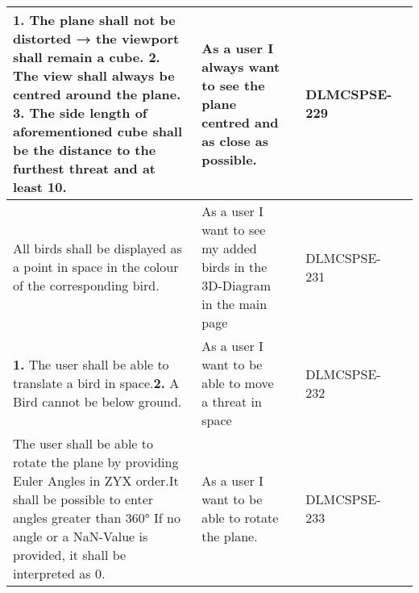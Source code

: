 \begin{xltabular}{\textwidth}{|X|X|M{1.8cm}|M{1.4cm}|M{1.3cm}|}
  \textbf{1.} The plane shall not be distorted → the viewport shall remain a cube. \newline\newline \textbf{2.} The view shall always be centred around the plane. \newline\newline \textbf{3.} The side length of aforementioned cube shall be the distance to the furthest threat and at least 10. & As a user I always want to see the plane centred and as close as possible. &  & {\color{purpleT}\ttfamily DLMCSPSE-229} &  \\ \hline 
  All birds shall be displayed as a point in space in the colour of the corresponding bird. & As a user I want to see my added birds in the 3D-Diagram in the main page &  & {\color{purpleT}\ttfamily DLMCSPSE-231} &  \\ \hline 
  \textbf{1.} The user shall be able to translate a bird in space.\newline\newline \textbf{2.} A Bird cannot be below ground. & As a user I want to be able to move a threat in space &  & {\color{purpleT}\ttfamily DLMCSPSE-232} &  \\ \hline 
  The user shall be able to rotate the plane by providing Euler Angles in ZYX order.\newline \newline It shall be possible to enter angles greater than 360° \newline \newline If no angle or a NaN-Value is provided, it shall be interpreted as 0. & As a user I want to be able to rotate the plane. &  & {\color{purpleT}\ttfamily DLMCSPSE-233} &  \\ \hline 

\end{xltabular}
